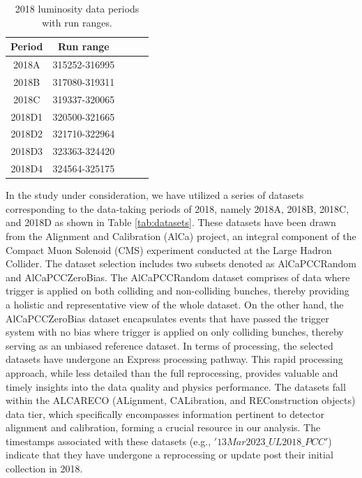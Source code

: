 \begin{table}
  \begin{center}
    \begin{tabular}{ccccc}
    \textbf{Period}   & \textbf{Run range} \\ \hline
     2018A      &        315252-316995         \\
     2018B      &        317080-319311         \\
     2018C      &        319337-320065         \\
     2018D1     &        320500-321665        \\
     2018D2     &        321710-322964         \\
     2018D3     &        323363-324420         \\
     2018D4     &        324564-325175        \\
      \end{tabular}
    \caption[Run ranges]{2018 luminosity data periods with run ranges.}
    \label{tab:period_run_ranges}
  \end{center}
\end{table}

In the study under consideration, we have utilized a series of datasets corresponding to the data-taking periods of 2018, namely 2018A, 2018B, 2018C, and 2018D as shown in Table \ref{tab:datasets}. These datasets have been drawn from the Alignment and Calibration (AlCa) project, an integral component of the Compact Muon Solenoid (CMS) experiment conducted at the Large Hadron Collider. The dataset selection includes two subsets denoted as AlCaPCCRandom and AlCaPCCZeroBias. The AlCaPCCRandom dataset comprises of data where trigger is applied on both colliding and non-colliding bunches, thereby providing a holistic and representative view of the whole dataset. On the other hand, the AlCaPCCZeroBias dataset encapsulates events that have passed the trigger system with no bias where trigger is applied on only colliding bunches, thereby serving as an unbiased reference dataset. In terms of processing, the selected datasets have undergone an Express processing pathway. This rapid processing approach, while less detailed than the full reprocessing, provides valuable and timely insights into the data quality and physics performance. The datasets fall within the ALCARECO (ALignment, CALibration, and REConstruction objects) data tier, which specifically encompasses information pertinent to detector alignment and calibration, forming a crucial resource in our analysis. The timestamps associated with these datasets (e.g., $'13Mar2023\_UL2018\_PCC'$) indicate that they have undergone a reprocessing or update post their initial collection in 2018.


